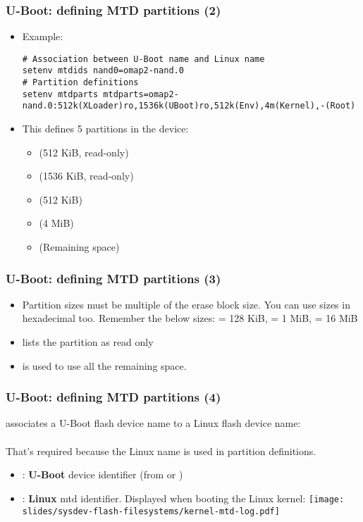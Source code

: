 \begin{frame}[fragile]
  \frametitle{U-Boot: defining MTD partitions (2)}
  \begin{itemize}
  \item Example:
  {\scriptsize
  \begin{verbatim}
# Association between U-Boot name and Linux name
setenv mtdids nand0=omap2-nand.0
# Partition definitions
setenv mtdparts mtdparts=omap2-nand.0:512k(XLoader)ro,1536k(UBoot)ro,512k(Env),4m(Kernel),-(Root)
  \end{verbatim}
  }
  \item This defines 5 partitions in the  device:
    \begin{itemize}
    \item {} (512 KiB, read-only)
    \item {} (1536 KiB, read-only)
    \item {} (512 KiB)
    \item {} (4 MiB)
    \item {} (Remaining space)
    \end{itemize}
  \end{itemize}
\end{frame}

\begin{frame}[fragile]
  \frametitle{U-Boot: defining MTD partitions (3)}
  \begin{itemize}
  \item Partition sizes must be multiple of the erase block size.
    You can use sizes in hexadecimal too. Remember the below sizes:
     = 128 KiB,  = 1 MiB,  = 16 MiB
  \item {} lists the partition as read only
  \item \code{-} is used to use all the remaining space.
  \end{itemize}
\end{frame}


\begin{frame}[fragile]
  \frametitle{U-Boot: defining MTD partitions (4)}
   associates a U-Boot flash device name
  to a Linux flash device name:\\
  \\
  \vspace{0.5cm}
  That's required because the Linux name is used in partition definitions.
  \begin{itemize}
  \item {}: {\bf U-Boot} device identifier (from
     or )
  \item {}: {\bf Linux} mtd identifier. Displayed
    when booting the Linux kernel:
    \texttt{[image: slides/sysdev-flash-filesystems/kernel-mtd-log.pdf]}\\
  \end{itemize}
\end{frame}

